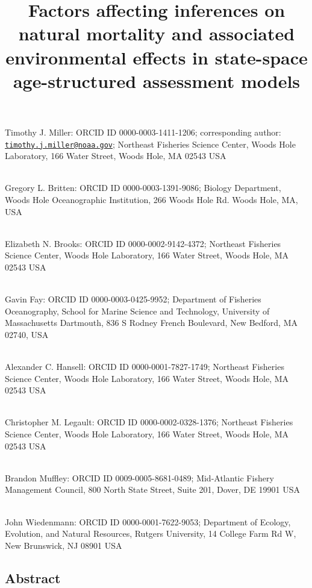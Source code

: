 \documentclass[
  12pt,
]{article}
\title{Factors affecting inferences on natural mortality and associated
environmental effects in state-space age-structured assessment models}
\author{}
\date{\vspace{-2.5em}}
\begin{document}
\maketitle

Timothy J. Miller: ORCID ID 0000-0003-1411-1206; corresponding author:
\href{mailto:timothy.j.miller@noaa.gov}{\nolinkurl{timothy.j.miller@noaa.gov}};
Northeast Fisheries Science Center, Woods Hole Laboratory, 166 Water
Street, Woods Hole, MA 02543 USA\\
\strut \\
Gregory L. Britten: ORCID ID 0000-0003-1391-9086; Biology Department,
Woods Hole Oceanographic Institution, 266 Woods Hole Rd. Woods Hole, MA,
USA\\
\strut \\
Elizabeth N. Brooks: ORCID ID 0000-0002-9142-4372; Northeast Fisheries
Science Center, Woods Hole Laboratory, 166 Water Street, Woods Hole, MA
02543 USA\\
\strut \\
Gavin Fay: ORCID ID 0000-0003-0425-9952; Department of Fisheries
Oceanography, School for Marine Science and Technology, University of
Massachusetts Dartmouth, 836 S Rodney French Boulevard, New Bedford, MA
02740, USA\\
\strut \\
Alexander C. Hansell: ORCID ID 0000-0001-7827-1749; Northeast Fisheries
Science Center, Woods Hole Laboratory, 166 Water Street, Woods Hole, MA
02543 USA\\
\strut \\
Christopher M. Legault: ORCID ID 0000-0002-0328-1376; Northeast
Fisheries Science Center, Woods Hole Laboratory, 166 Water Street, Woods
Hole, MA 02543 USA\\
\strut \\
Brandon Muffley: ORCID ID 0009-0005-8681-0489; Mid-Atlantic Fishery
Management Council, 800 North State Street, Suite 201, Dover, DE 19901
USA\\
\strut \\
John Wiedenmann: ORCID ID 0000-0001-7622-9053; Department of Ecology,
Evolution, and Natural Resources, Rutgers University, 14 College Farm Rd
W, New Brunswick, NJ 08901 USA\\

\pagebreak

\subsection*{Abstract}\label{abstract}
\end{document}
